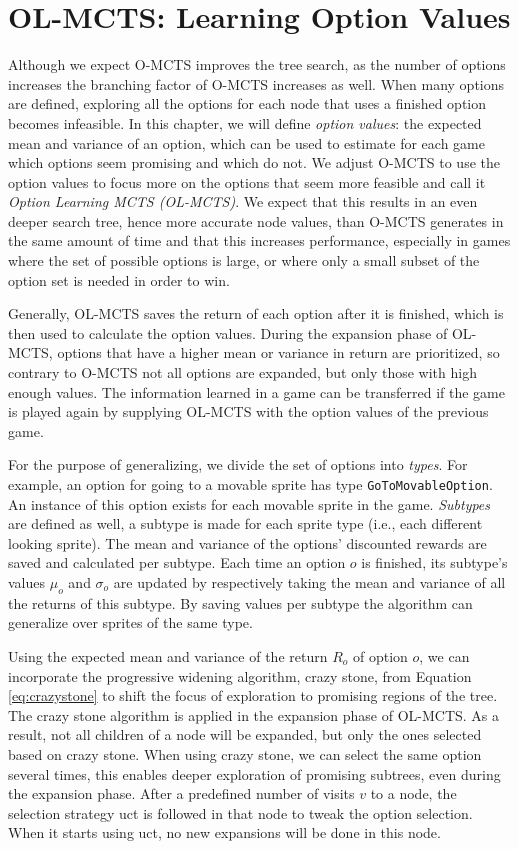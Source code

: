 \chapter{OL-MCTS: Learning Option Values} 
\label{sec:learning} 
Although we expect O-MCTS improves the tree search, as the number of options
increases the branching factor of O-MCTS increases as well. When many
options are defined, exploring all the options for each node that uses a
finished option becomes infeasible. In this chapter, we will define \emph{option
values}: the expected mean and variance of an option, which can be used to
estimate for each game which options seem promising and which do not. We adjust O-MCTS to use
the option values to focus more on the options that seem more feasible and call
it \emph{Option Learning MCTS (OL-MCTS)}. We expect that this results in an even
deeper search tree, hence more accurate node values, than O-MCTS generates in
the same amount of time and that this increases performance, especially in games
where the set of possible options is large, or where only a small subset of the
option set is needed in order to win.

Generally, OL-MCTS saves the return of each option after it is finished, which
is then used to calculate the option values. During the expansion phase of
OL-MCTS, options that have a higher mean or variance in return are prioritized,
so contrary to O-MCTS not all options are expanded, but only those with high
enough values. The information learned in a game can be transferred if the game
is played again by supplying OL-MCTS with the option values of the previous
game. 

For the purpose of generalizing, we divide the set of options into \emph{types}.
For example, an option for going to a movable sprite has type
\texttt{GoToMovableOption}. An instance of this option exists for each movable
sprite in the game. \emph{Subtypes} are defined as well, a subtype is made for
each sprite type (i.e., each different looking sprite). The mean and variance of
the options' discounted rewards are saved and calculated per subtype. Each time
an option $o$ is finished, its subtype's values $\mu_o$ and $\sigma_o$ are
updated by respectively taking the mean and variance of all the returns of this
subtype. By saving values per subtype the algorithm can generalize over sprites
of the same type.

Using the expected mean and variance of the return $R_o$ of option $o$, we can
incorporate the progressive widening algorithm, crazy stone, from Equation
\ref{eq:crazystone} to shift the focus of exploration to promising regions of
the tree. The crazy stone algorithm is applied in the expansion phase of OL-MCTS.
As a result, not all children of a node will be expanded, but only the ones
selected based on crazy stone. When using crazy stone, we can select the same
option several times, this enables deeper exploration of promising subtrees,
even during the expansion phase. After a predefined number of visits $v$ to a
node, the selection strategy \textsf{uct} is followed in that node to tweak the
option selection. When it starts using \textsf{uct}, no new expansions will be
done in this node.

